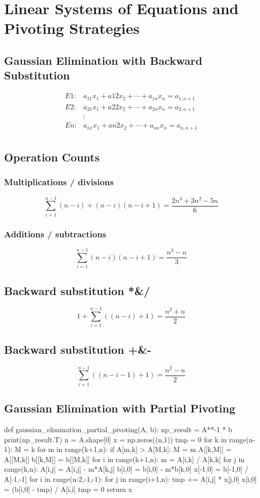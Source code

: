 \section{Linear Systems of Equations and Pivoting Strategies}
\subsection{Gaussian Elimination with Backward Substitution}
\begin{align*}
    E1: & a_{11}x_{1}+a{12}x_{2}+\cdots+a_{1n}x_{n} = a_{1,n+1} \\
    E2: & a_{21}x_{1}+a{22}x_{2}+\cdots+a_{2n}x_{n} = a_{2,n+1} \\
    & \vdots \\
    En: & a_{n1}x_{1}+a{n2}x_{2}+\cdots+a_{nn}x_{n} = a_{n,n+1} \\
\end{align*}

\subsection{Operation Counts}
\subsubsection{Multiplications / divisions}
\[
\sum_{i=1}^{n-1}(n-i)+(n-i)(n-i+1)=\frac{2n^3+3n^2-5n}{6}
\]
\subsubsection{Additions / subtractions}
\[
\sum_{i=1}^{n-1}(n-i)(n-i+1)=\frac{n^3-n}{3}
\]
\subsection{Backward substitution *\&/}
\[
1+\sum_{i=1}^{n-1}((n-i)+1)=\frac{n^2+n}{2}
\]
\subsection{Backward substitution +\&-}
\[
\sum_{i=1}^{n-1}((n-i-1)+1)=\frac{n^2-n}{2}
\]

\subsection{Gaussian Elimination with Partial Pivoting}
\begin{python}
def gaussian_elimination_partial_pivoting(A, b):
    np_result = A**-1 * b
    print(np_result.T)
    n = A.shape[0]
    x = np.zeros((n,1))
    tmp = 0
    for k in range(n-1):
        M = k
        for m in range(k+1,n):
            if A[m,k] > A[M,k]: M = m
        A[[k,M]] = A[[M,k]]
        b[[k,M]] = b[[M,k]]
        for i in range(k+1,n):
            m = A[i,k] / A[k,k]
            for j in range(k,n):
                A[i,j] = A[i,j] - m*A[k,j]
            b[i,0] = b[i,0] - m*b[k,0]
    x[-1,0] = b[-1,0] / A[-1,-1]
    for i in range(n-2,-1,-1):
        for j in range(i+1,n):
            tmp += A[i,j] * x[j,0]
        x[i,0] = (b[i,0] - tmp) / A[i,i]
        tmp = 0
    return x
\end{python}

